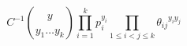 \documentclass{article}
\begin{document}
\thispagestyle{empty}

\[
  C^{-1} {y \choose y_1\ldots y_k}
  \prod_{i=1}^{k} p_i^{y_i}
  \prod_{1\leqslant i<j\leqslant k} {\theta_{ij}}^ {y_iy_j}
\]
\end{document}
